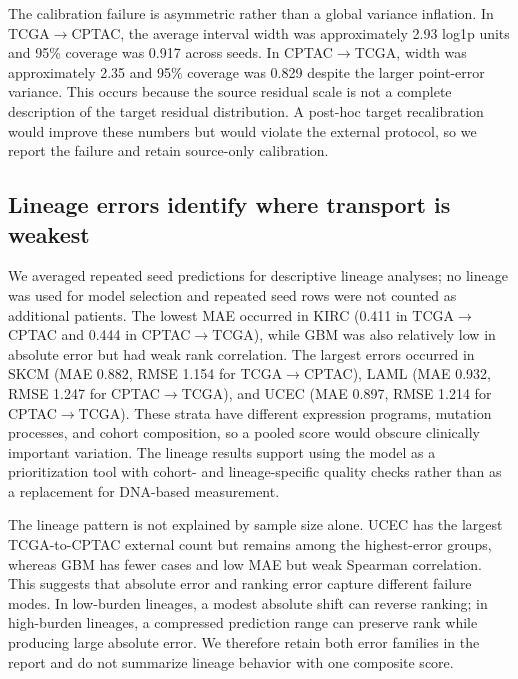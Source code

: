 \documentclass[11pt]{article}
\begin{document}
The calibration failure is asymmetric rather than a global variance inflation. In TCGA$\rightarrow$CPTAC, the average interval width was approximately 2.93 log1p units and 95\% coverage was 0.917 across seeds. In CPTAC$\rightarrow$TCGA, width was approximately 2.35 and 95\% coverage was 0.829 despite the larger point-error variance. This occurs because the source residual scale is not a complete description of the target residual distribution. A post-hoc target recalibration would improve these numbers but would violate the external protocol, so we report the failure and retain source-only calibration.

\subsection{Lineage errors identify where transport is weakest}
We averaged repeated seed predictions for descriptive lineage analyses; no lineage was used for model selection and repeated seed rows were not counted as additional patients. The lowest MAE occurred in KIRC (0.411 in TCGA$\rightarrow$CPTAC and 0.444 in CPTAC$\rightarrow$TCGA), while GBM was also relatively low in absolute error but had weak rank correlation. The largest errors occurred in SKCM (MAE 0.882, RMSE 1.154 for TCGA$\rightarrow$CPTAC), LAML (MAE 0.932, RMSE 1.247 for CPTAC$\rightarrow$TCGA), and UCEC (MAE 0.897, RMSE 1.214 for CPTAC$\rightarrow$TCGA). These strata have different expression programs, mutation processes, and cohort composition, so a pooled score would obscure clinically important variation. The lineage results support using the model as a prioritization tool with cohort- and lineage-specific quality checks rather than as a replacement for DNA-based measurement.

The lineage pattern is not explained by sample size alone. UCEC has the largest TCGA-to-CPTAC external count but remains among the highest-error groups, whereas GBM has fewer cases and low MAE but weak Spearman correlation. This suggests that absolute error and ranking error capture different failure modes. In low-burden lineages, a modest absolute shift can reverse ranking; in high-burden lineages, a compressed prediction range can preserve rank while producing large absolute error. We therefore retain both error families in the report and do not summarize lineage behavior with one composite score.
\end{document}
